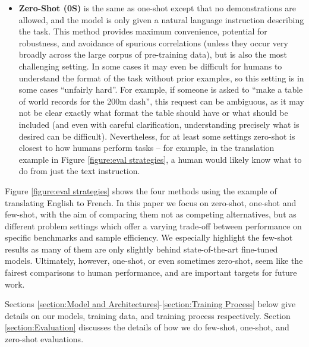 \documentclass{article}
\begin{document}
\begin{itemize}
    \item \textbf{Zero-Shot (0S)} is the same as one-shot except that no demonstrations are allowed, and the model is only given a natural language instruction describing the task.  This method provides maximum convenience, potential for robustness, and avoidance of spurious correlations (unless they occur very broadly across the large corpus of  pre-training data), but is also the most challenging setting.  In some cases it may even be difficult for humans to understand the format of the task without prior examples, so this setting is in some cases ``unfairly hard''.  For example, if someone is asked to ``make a table of world records for the 200m dash'', this request can be ambiguous, as it may not be clear exactly what format the table should have or what should be included (and even with careful clarification, understanding precisely what is desired can be difficult).  Nevertheless, for at least some settings zero-shot is closest to how humans perform tasks -- for example, in the translation example in Figure \ref{figure:eval strategies}, a human would likely know what to do from just the text instruction.
\end{itemize}

Figure \ref{figure:eval strategies} shows the four methods using the example of translating English to French.  In this paper we focus on zero-shot, one-shot and few-shot, with the aim of comparing them not as competing alternatives, but as different problem settings which offer a varying trade-off between performance on specific benchmarks and sample efficiency.  We especially highlight the few-shot results as many of them are only slightly behind state-of-the-art fine-tuned models.  Ultimately, however, one-shot, or even sometimes zero-shot, seem like the fairest comparisons to human performance, and are important targets for future work.

Sections \ref{section:Model and Architectures}-\ref{section:Training Process} below give details on our models, training data, and training process respectively.  
Section \ref{section:Evaluation} discusses the details of how we do few-shot, one-shot, and zero-shot evaluations.
\end{document}
